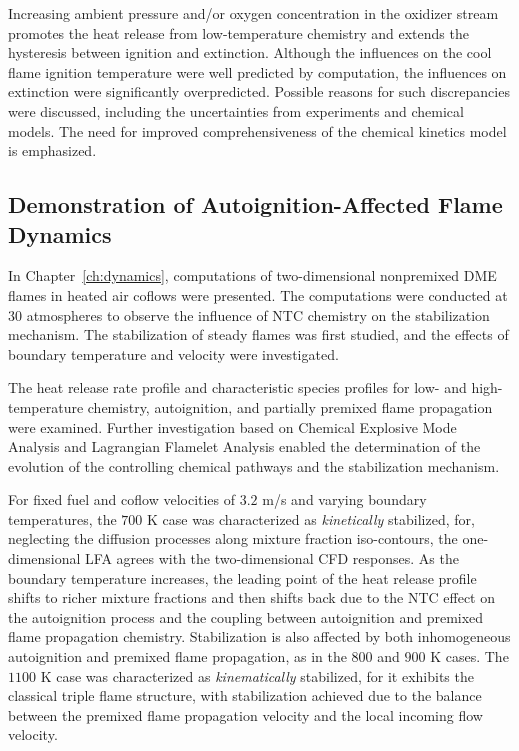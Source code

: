 Increasing ambient pressure and/or oxygen concentration in the oxidizer stream promotes the heat release from low-temperature chemistry and extends the hysteresis between ignition and extinction.  Although the influences on the cool flame ignition temperature were well predicted by computation, the influences on extinction were significantly overpredicted.  Possible reasons for such discrepancies were discussed, including the uncertainties from experiments and chemical models. The need for improved comprehensiveness of the chemical kinetics model is emphasized. 

\subsection{Demonstration of Autoignition-Affected Flame Dynamics}

In Chapter~\ref{ch:dynamics}, computations of two-dimensional nonpremixed DME flames in heated air coflows were presented.  The computations were conducted at $30$ atmospheres to observe the influence of NTC chemistry on the stabilization mechanism.  The stabilization of steady flames was first studied, and the effects of boundary temperature and velocity were investigated.  

The heat release rate profile and characteristic species profiles for low- and high-temperature chemistry, autoignition, and partially premixed flame propagation were examined.  Further investigation based on Chemical Explosive Mode Analysis and Lagrangian Flamelet Analysis enabled the determination of the evolution of the controlling chemical pathways and the stabilization mechanism.  

For fixed fuel and coflow velocities of $3.2$ m/s and varying boundary temperatures, the $700$ K case was characterized as \emph {kinetically} stabilized, for, neglecting the diffusion processes along mixture fraction iso-contours, the one-dimensional LFA agrees with the two-dimensional CFD responses.  As the boundary temperature increases, the leading point of the heat release profile shifts to richer mixture fractions and then shifts back due to the NTC effect on the autoignition process and the coupling between autoignition and premixed flame propagation chemistry.  Stabilization is also affected by both inhomogeneous autoignition and premixed flame propagation, as in the $800$ and $900$ K cases.  The $1100$ K case was characterized as \emph {kinematically} stabilized, for it exhibits the classical triple flame structure, with stabilization achieved due to the balance between the premixed flame propagation velocity and the local incoming flow velocity.

